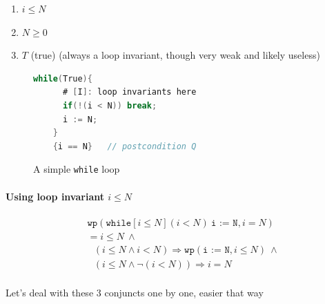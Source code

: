 \documentclass[oneside,11pt,dvipsnames]{book}
\renewcommand{\implies}{\Rightarrow}
\newcommand{\code}[1]{\texttt{#1}}
\begin{document}
 \begin{enumerate}
        \item $i \le N$
        \item $N \ge 0$
        \item $T$ (true) (always a loop invariant, though very weak and likely useless)
 \end{enumerate}


 \begin{figure}
    \begin{lstlisting}[language=C]
    while(True){
      # [I]: loop invariants here
      if(!(i < N)) break;
      i := N;
    }
    {i == N}   // postcondition Q
    \end{lstlisting} 
    \caption{A simple \code{while} loop}\label{fig:while-loop}
    \end{figure}
    


\paragraph{Using loop invariant $i \le N$}

\begin{equation*}
    \begin{split}
        &\code{wp}(\code{while}[i \le N] (i < N ) ~\code{i := N}, i = N)\\
    &= i \le N ~\land  \\
    &~~~ (i \le N \land  i < N) \implies \code{wp}(\code{i := N}, i \le N) ~\land \\
    &~~~ (i \le N \land \neg(i < N))  \implies i = N\\ 
    \end{split}
\end{equation*}

Let's deal with these 3 conjuncts one by one, easier that way
\end{document}
